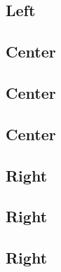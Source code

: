 \documentclass[a4paper, 11pt]{article}
\let \oldsection \section
\renewcommand{\section}{\vspace{-10pt}\oldsection}
\begin{document}
\begin{poster}
\begin{postercolumns}[5]
\begin{posterblock}
            \section{Left}
        \end{posterblock}

        \posternextcolumn
        \posternextcolumn

        \begin{posterblock}
            \section{Center}
        \end{posterblock}
        \begin{posterblock}
            \section{Center}
        \end{posterblock}
        \begin{posterblock}
            \section{Center}
        \end{posterblock}

        \posternextcolumn
        \posternextcolumn

        \begin{posterblock}
            \section{Right}
        \end{posterblock}
        \begin{posterblock}
            \section{Right}
        \end{posterblock}
        \begin{posterblock}
            \section{Right}
        \end{posterblock}

    \end{postercolumns}

    \begin{logobar}[logobar]
        \centering
        \hfill
        \hfill
        \hfill
    \end{logobar}

\end{poster}
\end{document}
